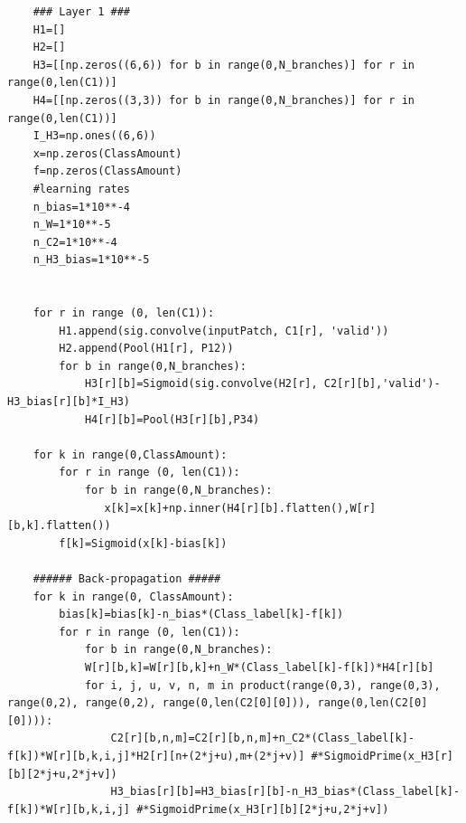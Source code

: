 \documentclass[a4paper,onecolumn]{report}
\begin{document}
\begin{appendices}
\begin{tiny}
\begin{verbatim}
    ### Layer 1 ###
    H1=[]
    H2=[]
    H3=[[np.zeros((6,6)) for b in range(0,N_branches)] for r in range(0,len(C1))]
    H4=[[np.zeros((3,3)) for b in range(0,N_branches)] for r in range(0,len(C1))]
    I_H3=np.ones((6,6))
    x=np.zeros(ClassAmount)
    f=np.zeros(ClassAmount)
    #learning rates
    n_bias=1*10**-4
    n_W=1*10**-5
    n_C2=1*10**-4
    n_H3_bias=1*10**-5


    for r in range (0, len(C1)):
        H1.append(sig.convolve(inputPatch, C1[r], 'valid'))
        H2.append(Pool(H1[r], P12))
        for b in range(0,N_branches):
            H3[r][b]=Sigmoid(sig.convolve(H2[r], C2[r][b],'valid')-H3_bias[r][b]*I_H3)
            H4[r][b]=Pool(H3[r][b],P34)

    for k in range(0,ClassAmount):
        for r in range (0, len(C1)):
            for b in range(0,N_branches):
               x[k]=x[k]+np.inner(H4[r][b].flatten(),W[r][b,k].flatten())
        f[k]=Sigmoid(x[k]-bias[k])

    ###### Back-propagation #####
    for k in range(0, ClassAmount):
        bias[k]=bias[k]-n_bias*(Class_label[k]-f[k])
        for r in range (0, len(C1)):
            for b in range(0,N_branches):
            W[r][b,k]=W[r][b,k]+n_W*(Class_label[k]-f[k])*H4[r][b]
            for i, j, u, v, n, m in product(range(0,3), range(0,3), range(0,2), range(0,2), range(0,len(C2[0][0])), range(0,len(C2[0][0]))):
                C2[r][b,n,m]=C2[r][b,n,m]+n_C2*(Class_label[k]-f[k])*W[r][b,k,i,j]*H2[r][n+(2*j+u),m+(2*j+v)] #*SigmoidPrime(x_H3[r][b][2*j+u,2*j+v])
                H3_bias[r][b]=H3_bias[r][b]-n_H3_bias*(Class_label[k]-f[k])*W[r][b,k,i,j] #*SigmoidPrime(x_H3[r][b][2*j+u,2*j+v])



	
\end{verbatim}
\end{tiny}

\end{appendices}
\end{document}
